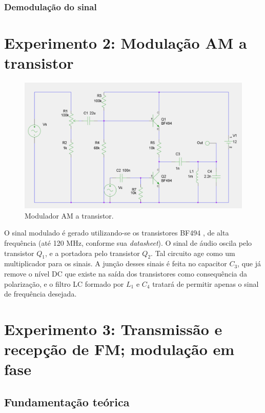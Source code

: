 \documentclass[]{report}
\begin{document}
\subsection{Demodulação do sinal}

\chapter{Experimento 2: Modulação AM a transistor}

\begin{figure}[H]
\begin{center}
\includegraphics[scale=0.25,clip]{./imagens/AM_Modulator_Transistor.png}
\end{center}
\caption{Modulador AM a transistor.}
\label{fig:modulador_AM_transistor}
\end{figure}

O sinal modulado é gerado utilizando-se os transistores BF494 \cite{BF494}, de alta frequência (até 120 MHz, conforme sua \textit{datasheet}). O sinal de áudio oscila pelo transistor $Q_1$, e a portadora pelo transistor $Q_2$. Tal circuito age como um multiplicador para os sinais. A junção desses sinais é feita no capacitor $C_3$, que já remove o nível DC que existe na saída dos transistores como consequência da polarização, e o filtro LC formado por $L_1$ e $C_4$ tratará de permitir apenas o sinal de frequência desejada.

\chapter{Experimento 3: Transmissão e recepção de FM; modulação em fase}
\section{Fundamentação teórica}
\end{document}
